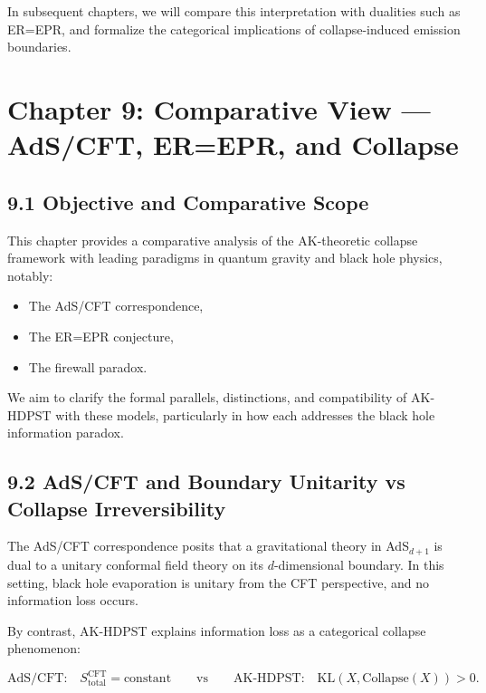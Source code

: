 \documentclass[11pt]{article}
\begin{document}
In subsequent chapters, we will compare this interpretation with dualities such as ER=EPR, and formalize the categorical implications of collapse-induced emission boundaries.



\section{Chapter 9: Comparative View — AdS/CFT, ER=EPR, and Collapse}

\subsection*{9.1 Objective and Comparative Scope}

This chapter provides a comparative analysis of the AK-theoretic collapse framework with leading paradigms in quantum gravity and black hole physics, notably:

\begin{itemize}
    \item The AdS/CFT correspondence,
    \item The ER=EPR conjecture,
    \item The firewall paradox.
\end{itemize}

We aim to clarify the formal parallels, distinctions, and compatibility of AK-HDPST with these models, particularly in how each addresses the black hole information paradox.

\subsection*{9.2 AdS/CFT and Boundary Unitarity vs Collapse Irreversibility}

The AdS/CFT correspondence posits that a gravitational theory in AdS\(_{d+1}\) is dual to a unitary conformal field theory on its \(d\)-dimensional boundary. In this setting, black hole evaporation is unitary from the CFT perspective, and no information loss occurs.

By contrast, AK-HDPST explains information loss as a categorical collapse phenomenon:

\[
\text{AdS/CFT:} \quad S_{\text{total}}^{\text{CFT}} = \text{constant}
\qquad\text{vs}\qquad
\text{AK-HDPST:} \quad \mathrm{KL}(X, \mathrm{Collapse}(X)) > 0.
\]
\end{document}
